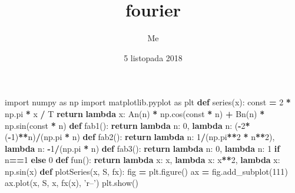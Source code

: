 \documentclass[]{article}
\title{fourier}
\author{Me}
\date{5 listopada 2018}
\newenvironment{Shaded}{\begin{snugshade}}{\end{snugshade}}
\newcommand{\KeywordTok}[1]{\textcolor[rgb]{0.13,0.29,0.53}{\textbf{{#1}}}}
\newcommand{\DecValTok}[1]{\textcolor[rgb]{0.00,0.00,0.81}{{#1}}}
\newcommand{\StringTok}[1]{\textcolor[rgb]{0.31,0.60,0.02}{{#1}}}
\newcommand{\ImportTok}[1]{{#1}}
\newcommand{\ControlFlowTok}[1]{\textcolor[rgb]{0.13,0.29,0.53}{\textbf{{#1}}}}
\newcommand{\OperatorTok}[1]{\textcolor[rgb]{0.81,0.36,0.00}{\textbf{{#1}}}}
\newcommand{\NormalTok}[1]{{#1}}
\begin{document}
\maketitle

\begin{Shaded}
\begin{Highlighting}[]
\ImportTok{import} \NormalTok{numpy }\ImportTok{as} \NormalTok{np}
\ImportTok{import} \NormalTok{matplotlib.pyplot }\ImportTok{as} \NormalTok{plt}
\KeywordTok{def} \NormalTok{series(x):}
    \NormalTok{const }\OperatorTok{=} \DecValTok{2} \OperatorTok{*} \NormalTok{np.pi }\OperatorTok{*} \NormalTok{x }\OperatorTok{/} \NormalTok{T}
    \ControlFlowTok{return} \KeywordTok{lambda} \NormalTok{x: An(n) }\OperatorTok{*} \NormalTok{np.cos(const }\OperatorTok{*} \NormalTok{n) }\OperatorTok{+} \NormalTok{Bn(n) }\OperatorTok{*} \NormalTok{np.sin(const }\OperatorTok{*} \NormalTok{n)}
\KeywordTok{def} \NormalTok{fab1():}
    \ControlFlowTok{return} \KeywordTok{lambda} \NormalTok{n: }\DecValTok{0}\NormalTok{, }\KeywordTok{lambda} \NormalTok{n: (}\OperatorTok{-}\DecValTok{2}\OperatorTok{*}\NormalTok{(}\OperatorTok{-}\DecValTok{1}\NormalTok{)}\OperatorTok{**}\NormalTok{n)}\OperatorTok{/}\NormalTok{(np.pi }\OperatorTok{*} \NormalTok{n)}
\KeywordTok{def} \NormalTok{fab2():}
    \ControlFlowTok{return} \KeywordTok{lambda} \NormalTok{n: }\DecValTok{1}\OperatorTok{/}\NormalTok{(np.pi}\OperatorTok{**}\DecValTok{2} \OperatorTok{*} \NormalTok{n}\OperatorTok{**}\DecValTok{2}\NormalTok{), }\KeywordTok{lambda} \NormalTok{n: }\OperatorTok{-}\DecValTok{1}\OperatorTok{/}\NormalTok{(np.pi }\OperatorTok{*} \NormalTok{n)}
\KeywordTok{def} \NormalTok{fab3():                                                              }
    \ControlFlowTok{return} \KeywordTok{lambda} \NormalTok{n: }\DecValTok{0}\NormalTok{, }\KeywordTok{lambda} \NormalTok{n: }\DecValTok{1} \ControlFlowTok{if} \NormalTok{n}\OperatorTok{==}\DecValTok{1} \ControlFlowTok{else} \DecValTok{0}   
\KeywordTok{def} \NormalTok{fun():}
    \ControlFlowTok{return} \KeywordTok{lambda} \NormalTok{x: x, }\KeywordTok{lambda} \NormalTok{x: x}\OperatorTok{**}\DecValTok{2}\NormalTok{, }\KeywordTok{lambda} \NormalTok{x: np.sin(x)}
\KeywordTok{def} \NormalTok{plotSeries(x, S, fx):}
    \NormalTok{fig }\OperatorTok{=} \NormalTok{plt.figure()}
    \NormalTok{ax }\OperatorTok{=} \NormalTok{fig.add_subplot(}\DecValTok{111}\NormalTok{)}
    \NormalTok{ax.plot(x, S, x, fx(x), }\StringTok{'r--'}\NormalTok{)}
    \NormalTok{plt.show()}
    

\end{Highlighting}
\end{Shaded}
\end{document}
